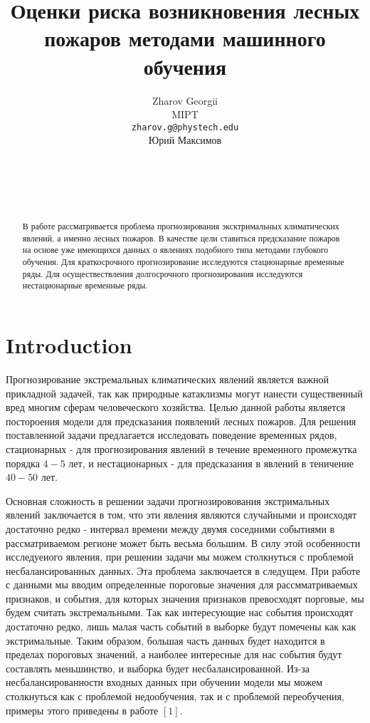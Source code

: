 \documentclass{article}
\title{Оценки риска возникновения лесных пожаров методами машинного обучения}
\author{ Zharov Georgii\\
MIPT\\
	\texttt{zharov.g@phystech.edu} \\
	\And
Юрий Максимов \\
\\
\\
\\
\\
}
\date{}
\begin{document}
\maketitle

\begin{abstract}
В работе рассматривается проблема прогнозирования эксктримальных климатических явлений, а именно лесных пожаров. В качестве цели ставиться предсказание пожаров на основе уже имеющихся данных о явлениях подобного типа методами глубокого обучения. Для краткосрочного прогнозирование исследуются стационарные временные ряды. Для осуществествления долгосрочного прогнозирования исследуются нестационарные временные ряды.
\end{abstract}



\section{Introduction}

Прогнозирование экстремальных климатических явлений является важной прикладной задачей, так как природные катаклизмы могут нанести существенный вред многим сферам человеческого хозяйства. Целью данной работы является постороения модели для предсказания появлений лесных пожаров. Для решения поставленной задачи предлагается исследовать поведение временных рядов, стационарных - для прогнозирования явлений в течение временного промежутка порядка $4-5$ лет, и нестационарных - для предсказания в явлений в теничение $40-50$ лет.

Основная сложность в решении задачи прогнозировования экстримальных явлений заключается в том, что эти явления являются случайными и происходят достаточно редко - интервал времени между двумя соседними событиями в рассматриваемом регионе может быть весьма большим. В силу этой особенности исследуеиого явления, при решении задачи мы можем столкнуться с проблемой несбалансированных данных. Эта проблема заключается в следущем. При работе с данными мы вводим определенные пороговые значения для рассмматриваемых признаков, и события, для которых значения признаков превосходят порговые, мы будем считать экстремальными. Так как интересующие нас события происходят достаточно редко, лишь малая часть событий в выборке будут помечены как как экстримальные. Таким образом, большая часть данных будет находится в пределах пороговых значений, а наиболее интересные для нас события будут составлять меньшинство, и выборка будет несбалансированной. Из-за несбалансированности входных данных при обучении модели мы можем столкнуться как с проблемой недообучения, так и с проблемой переобучения, примеры этого приведены в работе $[1]$. 
\end{document}

